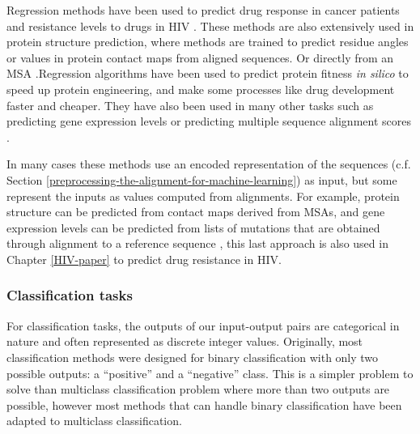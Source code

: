 \documentclass[
  11pt,
  twoside,
  BCOR=10mm,
  listof=totoc]{scrbook}
\begin{document}
Regression methods have been used to predict drug response in cancer patients \autocite{ammad-ud-dinSystematicIdentificationFeature2017} and resistance levels to drugs in HIV \autocite{steinerDrugResistancePrediction2020a}. These methods are also extensively used in protein structure prediction, where methods are trained to predict residue angles or values in protein contact maps from aligned sequences. \autocite{noeMachineLearningProtein2020,pearceSolutionProteinStructure2021,tunyasuvunakoolHighlyAccurateProtein2021,chengMachineLearningMethods2008,alquraishiMachineLearningProtein2021} Or directly from an MSA \autocite{jumperHighlyAccurateProtein2021}.Regression algorithms have been used to predict protein fitness \emph{in silico} \autocite{wittmannAdvancesMachineLearning2021,yangMachinelearningguidedDirectedEvolution2019,liCanMachineLearning2019} to speed up protein engineering, and make some processes like drug development faster and cheaper. They have also been used in many other tasks such as predicting gene expression levels \autocite{xieDeepAutoencoderModel2017} or predicting multiple sequence alignment scores \autocite{ortunoComparingDifferentMachine2015}.

In many cases these methods use an encoded representation of the sequences (c.f. Section \ref{preprocessing-the-alignment-for-machine-learning}) as input, but some represent the inputs as values computed from alignments. For example, protein structure can be predicted from contact maps \autocite{wangAccurateNovoPrediction2017} derived from MSAs, and gene expression levels can be predicted from lists of mutations that are obtained through alignment to a reference sequence \autocite{xieDeepAutoencoderModel2017}, this last approach is also used in Chapter \ref{HIV-paper} to predict drug resistance in HIV.

\hypertarget{classification-tasks}{%
\subsubsection{Classification tasks}\label{classification-tasks}}

For classification tasks, the outputs of our input-output pairs are categorical in nature and often represented as discrete integer values. Originally, most classification methods were designed for binary classification with only two possible outputs: a ``positive'' and a ``negative'' class. This is a simpler problem to solve than multiclass classification problem where more than two outputs are possible, however most methods that can handle binary classification have been adapted to multiclass classification.
\end{document}
